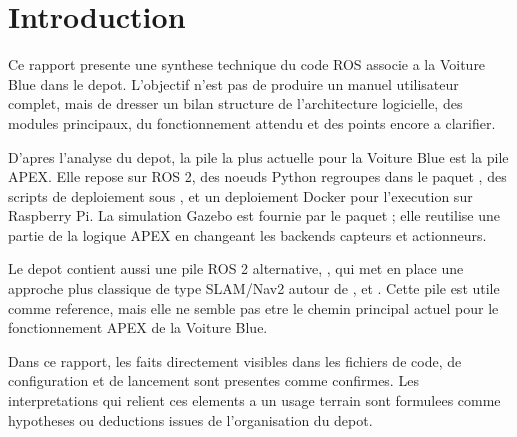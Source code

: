 \section{Introduction}

Ce rapport presente une synthese technique du code ROS associe a la Voiture Blue dans le depot. L'objectif n'est pas de produire un manuel utilisateur complet, mais de dresser un bilan structure de l'architecture logicielle, des modules principaux, du fonctionnement attendu et des points encore a clarifier.

D'apres l'analyse du depot, la pile la plus actuelle pour la Voiture Blue est la pile APEX. Elle repose sur ROS 2, des noeuds Python regroupes dans le paquet , des scripts de deploiement sous , et un deploiement Docker pour l'execution sur Raspberry Pi. La simulation Gazebo est fournie par le paquet ; elle reutilise une partie de la logique APEX en changeant les backends capteurs et actionneurs.

Le depot contient aussi une pile ROS 2 alternative, , qui met en place une approche plus classique de type SLAM/Nav2 autour de ,  et . Cette pile est utile comme reference, mais elle ne semble pas etre le chemin principal actuel pour le fonctionnement APEX de la Voiture Blue.

Dans ce rapport, les faits directement visibles dans les fichiers de code, de configuration et de lancement sont presentes comme confirmes. Les interpretations qui relient ces elements a un usage terrain sont formulees comme hypotheses ou deductions issues de l'organisation du depot.

